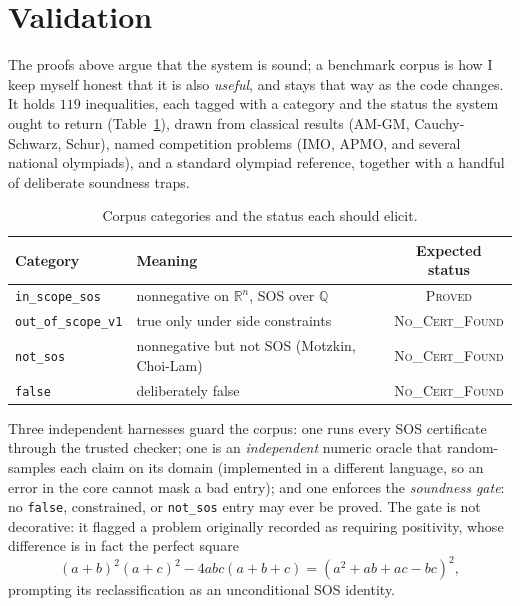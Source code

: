\documentclass[11pt]{article}
\theoremstyle{definition}
\theoremstyle{plain}
\newcommand{\R}{\mathbb{R}}
\newcommand{\Q}{\mathbb{Q}}
\begin{document}
\section{Validation}
\label{sec:validation}

The proofs above argue that the system is sound; a benchmark corpus is how I keep
myself honest that it is also \emph{useful}, and stays that way as the code
changes. It holds $119$ inequalities, each tagged with a category and the status
the system ought to return (Table~\ref{tab:corpus}), drawn from classical results
(AM-GM, Cauchy-Schwarz, Schur), named competition problems (IMO, APMO, and
several national olympiads), and a standard olympiad reference, together with a
handful of deliberate soundness traps.

\begin{table}[h]
\centering
\begin{tabular}{@{}llc@{}}
\toprule
Category & Meaning & Expected status \\
\midrule
\texttt{in\_scope\_sos} & nonnegative on $\R^n$, SOS over $\Q$ & \textsc{Proved} \\
\texttt{out\_of\_scope\_v1} & true only under side constraints & \textsc{No\_Cert\_Found} \\
\texttt{not\_sos} & nonnegative but not SOS (Motzkin, Choi-Lam) & \textsc{No\_Cert\_Found} \\
\texttt{false} & deliberately false & \textsc{No\_Cert\_Found} \\
\bottomrule
\end{tabular}
\caption{Corpus categories and the status each should elicit.}
\label{tab:corpus}
\end{table}

Three independent harnesses guard the corpus: one runs every SOS certificate
through the trusted checker; one is an \emph{independent} numeric oracle that
random-samples each claim on its domain (implemented in a different language, so
an error in the core cannot mask a bad entry); and one enforces the
\emph{soundness gate}: no \texttt{false}, constrained, or \texttt{not\_sos}
entry may ever be proved. The gate is not decorative: it flagged a
problem originally recorded as requiring positivity, whose difference is in fact
the perfect square
\[
  (a+b)^2(a+c)^2 - 4abc(a+b+c) = (a^2 + ab + ac - bc)^2 ,
\]
prompting its reclassification as an unconditional SOS identity.
\end{document}
